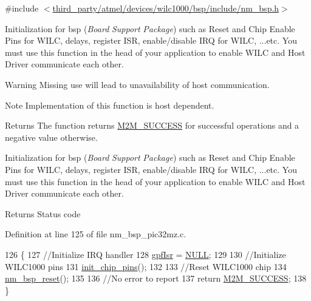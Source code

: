 {\ttfamily \#include $<$\hyperlink{nm__bsp_8h}{third\+\_\+party/atmel/devices/wilc1000/bsp/include/nm\+\_\+bsp.\+h}$>$}



Initialization for bsp ({\itshape Board} {\itshape Support} {\itshape Package}) such as Reset and Chip Enable Pins for W\+I\+LC, delays, register I\+SR, enable/disable I\+RQ for W\+I\+LC, ...etc. You must use this function in the head of your application to enable W\+I\+LC and Host Driver communicate each other. 

\begin{DoxyWarning}{Warning}
Missing use will lead to unavailability of host communication. 
\end{DoxyWarning}
\begin{DoxyNote}{Note}
Implementation of this function is host dependent. 
\end{DoxyNote}
\begin{DoxyReturn}{Returns}
The function returns \hyperlink{nm__common_8h_a9ef27ba27aafdd1aa3a79d3ba2c36b8f}{M2\+M\+\_\+\+S\+U\+C\+C\+E\+SS} for successful operations and a negative value otherwise.
\end{DoxyReturn}
Initialization for bsp ({\itshape Board} {\itshape Support} {\itshape Package}) such as Reset and Chip Enable Pins for W\+I\+LC, delays, register I\+SR, enable/disable I\+RQ for W\+I\+LC, ...etc. You must use this function in the head of your application to enable W\+I\+LC and Host Driver communicate each other.

\begin{DoxyReturn}{Returns}
Status code 
\end{DoxyReturn}


Definition at line 125 of file nm\+\_\+bsp\+\_\+pic32mz.\+c.


\begin{DoxyCode}
126 \{
127    \textcolor{comment}{//Initialize IRQ handler}
128    \hyperlink{nm__bsp__pic32mz_8c_a1fc16160cd8e35ab3f77abb4bc40477e}{gpfIsr} = \hyperlink{group__BSPDefine_ga070d2ce7b6bb7e5c05602aa8c308d0c4}{NULL};
129 
130    \textcolor{comment}{//Initialize WILC1000 pins}
131    \hyperlink{nm__bsp__pic32mz_8c_a35b8122ba907d2c6c8aaa450e3d13842}{init\_chip\_pins}();
132 
133    \textcolor{comment}{//Reset WILC1000 chip}
134    \hyperlink{group__NmBspResetFn_ga3e540428a9246a27c61999ecb7e13d05}{nm\_bsp\_reset}();
135 
136    \textcolor{comment}{//No error to report}
137    \textcolor{keywordflow}{return} \hyperlink{nm__common_8h_a9ef27ba27aafdd1aa3a79d3ba2c36b8f}{M2M\_SUCCESS};
138 \}
\end{DoxyCode}

